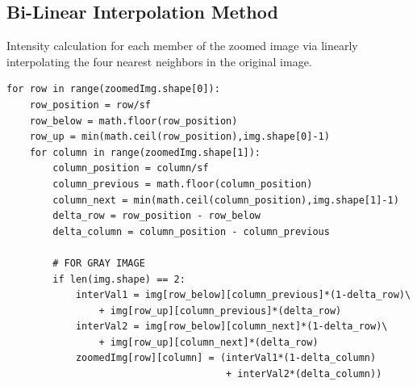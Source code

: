 \documentclass[12pt,a4paper]{article}
\begin{document}
\subsection{Bi-Linear Interpolation Method}
Intensity calculation for each member of the zoomed image via linearly interpolating the four nearest neighbors in the original image.
\begin{lstlisting}
for row in range(zoomedImg.shape[0]):
    row_position = row/sf
    row_below = math.floor(row_position)
    row_up = min(math.ceil(row_position),img.shape[0]-1)
    for column in range(zoomedImg.shape[1]):
        column_position = column/sf
        column_previous = math.floor(column_position)
        column_next = min(math.ceil(column_position),img.shape[1]-1)
        delta_row = row_position - row_below
        delta_column = column_position - column_previous

        # FOR GRAY IMAGE
        if len(img.shape) == 2:  
            interVal1 = img[row_below][column_previous]*(1-delta_row)\
                + img[row_up][column_previous]*(delta_row)
            interVal2 = img[row_below][column_next]*(1-delta_row)\
                + img[row_up][column_next]*(delta_row)
            zoomedImg[row][column] = (interVal1*(1-delta_column)
                                      + interVal2*(delta_column))
\end{lstlisting}

\newpage
\end{document}
